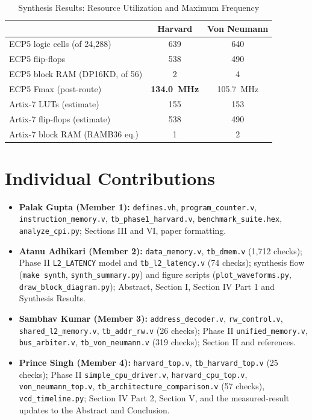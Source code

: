 \documentclass[conference]{IEEEtran}
\begin{document}
\begin{table}[htbp]
\caption{Synthesis Results: Resource Utilization and Maximum Frequency}\label{tab:syn}
\begin{center}
\footnotesize
\begin{tabular}{@{}lcc@{}}
\toprule
 & \textbf{Harvard} & \textbf{Von Neumann} \\
\midrule
ECP5 logic cells (of 24,288) & 639 & 640 \\
ECP5 flip-flops & 538 & 490 \\
ECP5 block RAM (DP16KD, of 56) & 2 & 4 \\
ECP5 Fmax (post-route) & \textbf{134.0~MHz} & 105.7~MHz \\
Artix-7 LUTs (estimate) & 155 & 153 \\
Artix-7 flip-flops (estimate) & 538 & 490 \\
Artix-7 block RAM (RAMB36 eq.) & 1 & 2 \\
\bottomrule
\end{tabular}
\end{center}
\end{table}

\section{Individual Contributions}
\begin{itemize}
    \item \textbf{Palak Gupta (Member 1):} \texttt{defines.vh}, \texttt{program\_counter.v}, \texttt{instruction\_memory.v}, \texttt{tb\_phase1\_harvard.v}, \texttt{benchmark\_suite.hex}, \texttt{analyze\_cpi.py}; Sections III and VI, paper formatting.
    \item \textbf{Atanu Adhikari (Member 2):} \texttt{data\_memory.v}, \texttt{tb\_dmem.v} (1,712 checks); Phase II \texttt{L2\_LATENCY} model and \texttt{tb\_l2\_latency.v} (74 checks); synthesis flow (\texttt{make synth}, \texttt{synth\_summary.py}) and figure scripts (\texttt{plot\_waveforms.py}, \texttt{draw\_block\_diagram.py}); Abstract, Section I, Section IV Part 1 and Synthesis Results.
    \item \textbf{Sambhav Kumar (Member 3):} \texttt{address\_decoder.v}, \texttt{rw\_control.v}, \texttt{shared\_l2\_memory.v}, \texttt{tb\_addr\_rw.v} (26 checks); Phase II \texttt{unified\_memory.v}, \texttt{bus\_arbiter.v}, \texttt{tb\_von\_neumann.v} (319 checks); Section II and references.
    \item \textbf{Prince Singh (Member 4):} \texttt{harvard\_top.v}, \texttt{tb\_harvard\_top.v} (25 checks); Phase II \texttt{simple\_cpu\_driver.v}, \texttt{harvard\_cpu\_top.v}, \texttt{von\_neumann\_top.v}, \texttt{tb\_architecture\_comparison.v} (57 checks), \texttt{vcd\_timeline.py}; Section IV Part 2, Section V, and the measured-result updates to the Abstract and Conclusion.
\end{itemize}
\end{document}
